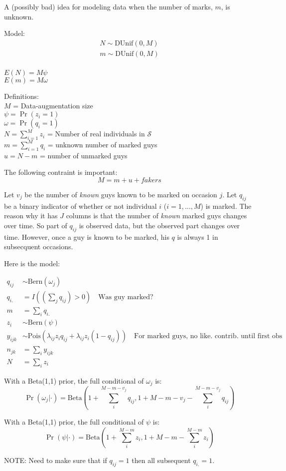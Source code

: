 \documentclass[12pt]{article}
\begin{document}
A (possibly bad) idea for modeling data when the number of marks, $m$, is
unknown. %

\vspace{1cm}

Model:
\begin{align*}
  N \sim \text{DUnif}(0, M) \\
  m \sim \text{DUnif}(0, M) \\
\end{align*}

$E(N) = M\psi$ \\
$E(m) = M\omega$


Definitions: \\
$M$ = Data-augmentation size \\
$\psi = \Pr(z_i=1)$ \\ %
$\omega = \Pr(q_i=1)$ \\
$N = \sum_{i=1}^M z_i$ = Number of real individuals in $\mathcal{S}$ \\
$m = \sum_{i=1}^M q_i$ = unknown number of marked guys \\
$u = N - m$ = number of unmarked guys

\vspace{1cm}

The following contraint is important:
\[
M = m + u + fakers
\]


\newpage

Let $v_j$ be the number of \textit{known} guys known to be marked on
occasion $j$. Let $q_{ij}$ be a binary indicator of whether or not individual $i$
($i=1,\ldots,M$) is marked. The reason why it has $J$ columns is that
the number of \textit{known} marked guys changes over time. So part of
$q_{ij}$ is observed data, but the observed part changes over time.
However, once a
guy is known to be marked, his $q$ is always 1 in subsecquent occasions.

Here is the model:

\begin{align*}
q_{ij} &\sim \text{Bern}(\omega_j) \\
q_{i.} &= I((\sum_j q_{ij})>0) \quad \text{Was guy marked?}\\
m &= \sum_i q_{i.} \\
z_i &\sim \text{Bern}(\psi) \\
y_{ijk} &\sim
\text{Pois}(\lambda_{ij}z_{i}q_{ij} + \lambda_{ij}z_i(1-q_{ij})) \quad
\text{For marked guys, no like. contrib. until first obs}\\
n_{jk} &= \sum_i y_{ijk} \\
N &= \sum_i z_i
\end{align*}

With a Beta(1,1) prior, the full conditional of $\omega_j$ is:
\[
\Pr(\omega_j|\cdot) = \text{Beta}(1+\sum_i^{M-m-v_j} q_{ij}, 1+M-m-v_j-\sum_i^{M-m-v_j}q_{ij})
\]

With a Beta(1,1) prior, the full conditional of $\psi$ is:
\[
\Pr(\psi|\cdot) = \text{Beta}(1+\sum_i^{M-m} z_{i}, 1+M-m-\sum_i^{M-m}z_i)
\]

NOTE: Need to make sure that if $q_{ij}=1$ then all subsequent
$q_{i.}=1$.
\end{document}
